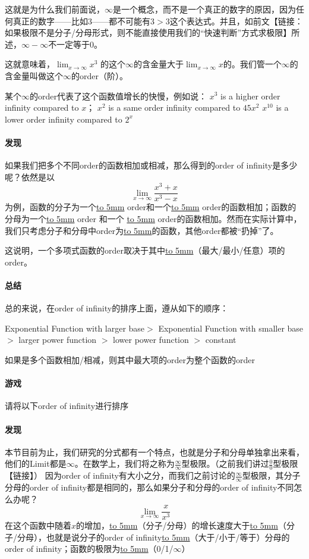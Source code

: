 \documentclass[UTF8]{ctexart}
\begin{document}
这就是为什么我们前面说，$\infty$是一个概念，而不是一个真正的数字的原因，因为任何真正的数字——比如3——都不可能有$3>3$这个表达式。并且，如前文【链接：如果极限不是分子/分母形式，则不能直接使用我们的“快速判断”方式求极限】所述，$\infty - \infty$不一定等于0。

这就意味着，${\lim_{x \to \infty} x^3}$ 的这个$\infty$的含金量大于${\lim_{x \to \infty} x}$的。我们管一个$\infty$的含金量叫做这个$\infty$的order（阶）。 

某个$\infty$的order代表了这个函数值增长的快慢，例如说：
$x^3$ is a higher order infinity compared to $x$；
$x^2$ is a same order infinity compared to $45x^2$
$x^10$ is a lower order infinity compared to $2^x$

\paragraph{发现}
如果我们把多个不同order的函数相加或相减，那么得到的order of infinity是多少呢？依然是以
\[{\lim_{x \to \infty} \frac{x^3+x}{x^3-x}} \]
为例，函数的分子为一个\underline{\hbox to 5mm{}} order和一个\underline{\hbox to 5mm{}} order的函数相加；函数的分母为一个\underline{\hbox to 5mm{}} order 和一个 \underline{\hbox to 5mm{}} order的函数相加。然而在实际计算中，我们只考虑分子和分母中order为\underline{\hbox to 5mm{}}的函数，其他order都被“扔掉”了。

这说明，一个多项式函数的order取决于其中\underline{\hbox to 5mm{}}（最大/最小/任意）项的order。

\paragraph{总结}
总的来说，在order of infinity的排序上面，遵从如下的顺序：

Exponential Function with larger base$>$ Exponential Function with smaller base $>$  larger power function $>$  lower power function $>$  constant

如果是多个函数相加/相减，则其中最大项的order为整个函数的order


\paragraph{游戏}
请将以下order of infinity进行排序

\paragraph{发现}
本节目前为止，我们研究的分式都有一个特点，也就是分子和分母单独拿出来看，他们的Limit都是$\infty$。在数学上，我们将之称为$\frac{\infty}{\infty}$型极限。（之前我们讲过$\frac{0}{0}$型极限【链接】）
因为order of infinity有大小之分，而我们之前讨论的$\frac{\infty}{\infty}$型极限，其分子分母的order of infinity都是相同的，那么如果分子和分母的order of infinity不同怎么办呢？
\[ {\lim_{x \to \infty} \frac{x}{x^3}}\]
在这个函数中随着$x$的增加，\underline{\hbox to 5mm{}}（分子/分母）的增长速度大于\underline{\hbox to 5mm{}}（分子/分母），也就是说分子的order of infinity\underline{\hbox to 5mm{}}（大于/小于/等于）分母的order of infinity；函数的极限为\underline{\hbox to 5mm{}}（0/1/$\infty$）
\end{document}
